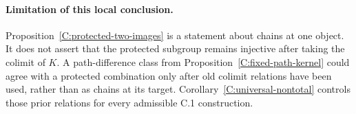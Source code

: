 \paragraph{Limitation of this local conclusion.}
Proposition~\ref{C:protected-two-images} is a statement about chains
at one object. It does not assert that the protected subgroup remains
injective after taking the colimit of $K$. A path-difference class
from Proposition~\ref{C:fixed-path-kernel} could agree with a protected
combination only after old colimit relations have been used, rather
than as chains at its target. Corollary~\ref{C:universal-nontotal}
controls those prior relations for every admissible C.1 construction.

